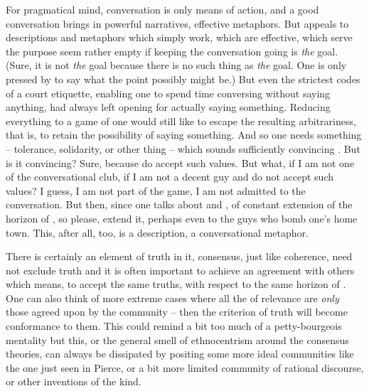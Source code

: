 For pragmatical mind, conversation is only means of action, and a good
conversation brings in powerful narratives, effective metaphors.  But
appeals to descriptions and metaphors which simply work, which are
effective, which serve the purpose seem rather empty if keeping the
conversation going is {\em the} goal.  (Sure, it is not {\em the} goal
because there is no such thing as {\em the} goal.  One is only pressed
by  to say what the point possibly might be.) 
But even the strictest codes of a court etiquette, enabling one to spend
time conversing without saying anything, had always left opening for actually 
saying something.  Reducing everything to a game of  one
would still like to escape the resulting arbitrariness, that is, to retain the
possibility of saying something.
And so one needs something -- tolerance, solidarity, or other thing -- 
which sounds sufficiently convincing .  But is it convincing?  Sure,
because  do accept such values.  But what,
 if I am not one of the conversational club, if I am not a
decent guy and do not accept such values?  I guess, I am not part of
the game, I am not admitted to the conversation.  But then, since
one talks about  and , of constant
extension of the horizon of , so please, extend it, perhaps
even to the guys who bomb one's home town.  This, after all, too, is a
description, a conversational metaphor.

\pa
There is certainly an element of truth in it, consensus, just like coherence,
need not exclude truth and it
is often important to achieve an agreement with others which means, to accept
the same truths, with respect to the same horizon of .  One can
also think of more extreme cases where all the  of relevance
are {\em only} those agreed upon by the community -- then the criterion of truth
will become conformance to them. This could remind a bit too much of a
petty-bourgeois mentality but this, or the general smell of ethnocentrism around
the consensus theories, can always be dissipated by positing some more ideal
communities like the one just seen in Pierce, or a bit more limited community of
rational discourse, or other inventions of the kind.

